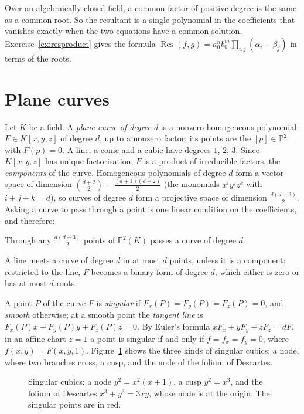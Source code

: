 Over an algebraically closed field, a common factor of positive degree is the same as a common root. So the resultant is a single polynomial in the
coefficients that vanishes exactly when the two equations have a common solution. Exercise~\ref{ex:resproduct} gives the formula
$\operatorname{Res}(f,g)=a_0^nb_0^m\prod_{i,j}(\alpha_i-\beta_j)$ in terms of the roots.

\section{Plane curves}

Let $K$ be a field. A \emph{plane curve of degree $d$} is a nonzero homogeneous polynomial $F\in K[x,y,z]$ of degree $d$, up to a nonzero factor; its
points are the $[p]\in\mathbb P^2$ with $F(p)=0$. A line, a conic and a cubic have degrees $1$, $2$, $3$. Since $K[x,y,z]$ has unique factorisation,
$F$ is a product of irreducible factors, the \emph{components} of the curve. Homogeneous polynomials of degree $d$ form a vector space of dimension
$\binom{d+2}2=\frac{(d+1)(d+2)}2$ (the monomials $x^iy^jz^k$ with $i+j+k=d$), so curves of degree $d$ form a projective space of dimension
$\frac{d(d+3)}2$. Asking a curve to pass through a point is one linear condition on the coefficients, and therefore:

\begin{proposition}\label{prop:dimcurves}
Through any $\frac{d(d+3)}2$ points of $\mathbb P^2(K)$ passes a curve of degree $d$.
\end{proposition}

A line meets a curve of degree $d$ in at most $d$ points, unless it is a component: restricted to the line, $F$ becomes a binary form of degree $d$, which
either is zero or has at most $d$ roots.

A point $P$ of the curve $F$ is \emph{singular} if $F_x(P)=F_y(P)=F_z(P)=0$, and \emph{smooth} otherwise; at a smooth point the \emph{tangent line} is
$F_x(P)x+F_y(P)y+F_z(P)z=0$. By Euler's formula $xF_x+yF_y+zF_z=dF$, in an affine chart $z=1$ a point is singular if and only if $f=f_x=f_y=0$, where
$f(x,y)=F(x,y,1)$. Figure~\ref{fig:singular} shows the three kinds of singular cubics: a node, where two branches cross, a cusp, and the node of the folium of
Descartes.

\begin{figure}[ht]
\centering
{}
\caption{Singular cubics: a node $y^2=x^2(x+1)$, a cusp $y^2=x^3$, and the folium of Descartes $x^3+y^3=3xy$, whose node is at the origin. The singular
points are in red.}
\label{fig:singular}
\end{figure}

